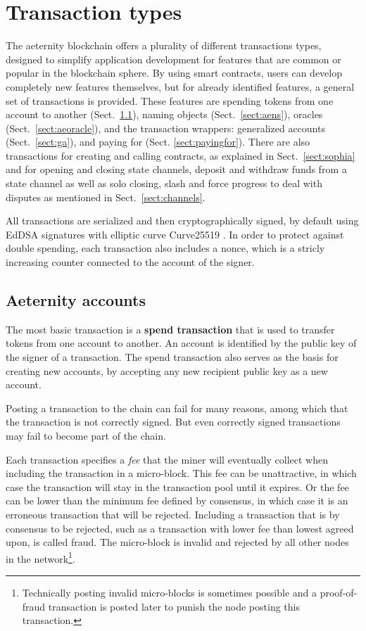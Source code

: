 \section{Transaction types}
\label{sect:transactions}

The aeternity blockchain offers a plurality of different transactions
types, designed to simplify application development for features that are
common or popular in the blockchain sphere. By using smart contracts,
users can develop completely new features themselves, but for already
identified features, a general set of transactions is
provided. These features are spending tokens from one account to
another (Sect.\ \ref{sect:aespend}), naming objects (Sect.\
\ref{sect:aens}), oracles (Sect.\ \ref{sect:aeoracle}), and the
transaction wrappers: generalized
accounts (Sect.\ \ref{sect:ga}), and paying for
(Sect. \ref{sect:payingfor}).
There are also transactions for creating and calling contracts, as
explained in Sect.\ \ref{sect:sophia} and for opening and closing
state channels, deposit and withdraw funds from a state channel as
well as solo closing, slash and force progress to deal with
disputes as mentioned in Sect.\ \ref{sect:channels}.

All transactions are serialized and then cryptographically signed, by default using EdDSA \cite{bernstein2012high}
signatures with elliptic curve Curve25519
\cite{bernstein2006curve25519}. In order to protect against double
spending, each transaction also includes a nonce, which is a stricly
increasing counter connected to the account of the signer.

\subsection{Aeternity accounts}
\label{sect:aespend}

The most basic transaction is a \textbf{spend
transaction} that is used to transfer tokens from one account to
another. An account is identified by the public key of the signer of
a transaction. The spend transaction also serves as the basis for
creating new accounts, by accepting any new recipient public key as a new
account.

Posting a transaction to the chain can fail for many reasons, among
which that the transaction is not correctly signed. But even correctly
signed transactions may fail to become part of the chain.

Each transaction specifies a \textit{fee} that the miner will
     eventually collect when including the transaction in a
     micro-block. This fee can be unattractive, in which case the
     transaction will stay in the transaction pool until it
     expires. Or the fee can be lower than the minimum fee defined by
     consensus, in which case it is an erroneous transaction that
     will be rejected. Including a transaction that is by consensus to be rejected,  such as a
     transaction with lower fee than lowest agreed upon, is called
     fraud. The micro-block is invalid and rejected by
     all other nodes in the network\footnote{Technically posting
       invalid micro-blocks is sometimes possible and a proof-of-fraud
       transaction is posted later to punish the node posting this transaction.}.

